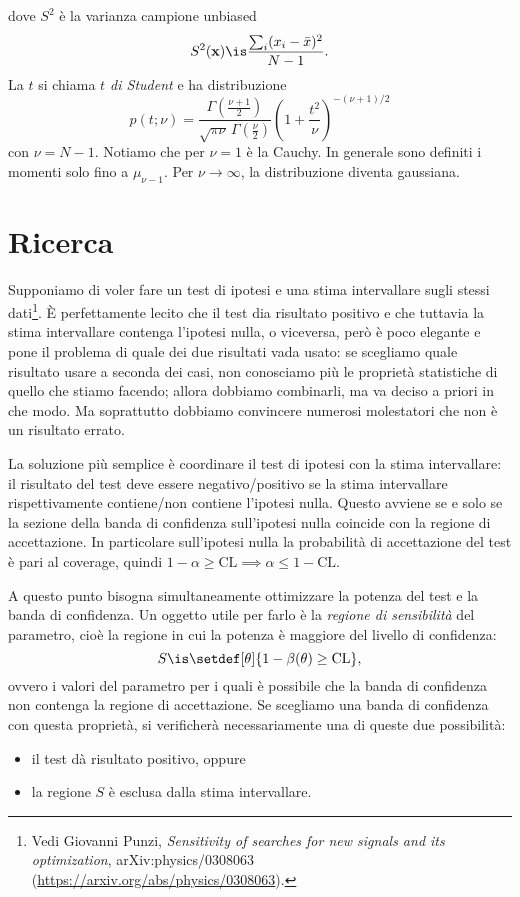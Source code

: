 dove $S^2$ è la varianza campione unbiased
\begin{equation*}
	S^2(\mathbf x)
	\is \frac {\sum_i (x_i-\bar x)^2} {N-1}.
\end{equation*}
La $t$ si chiama \emph{$t$ di Student} e ha distribuzione
\begin{equation*}
	p(t;\nu)
	= \frac {\Gamma\left(\frac{\nu+1}2\right)} {\sqrt{\pi\nu}\, \Gamma\left(\frac\nu2\right)}
	\left(1+\frac{t^2}\nu\right)^{-(\nu+1)/2}
\end{equation*}
con $\nu=N-1$.
Notiamo che per $\nu=1$ è la Cauchy.
In generale sono definiti i momenti solo fino a $\mu_{\nu-1}$.
Per $\nu\to\infty$, la distribuzione diventa gaussiana.

\section{Ricerca}

Supponiamo di voler fare un test di ipotesi e una stima intervallare sugli stessi dati\footnote{Vedi Giovanni Punzi, \emph{Sensitivity of searches for new signals and its optimization}, 	arXiv:physics/0308063 (\url{https://arxiv.org/abs/physics/0308063}).}.
È perfettamente lecito che il test dia risultato positivo
e che tuttavia la stima intervallare contenga l'ipotesi nulla, o viceversa,
però è poco elegante e pone il problema di quale dei due risultati vada usato:
se scegliamo quale risultato usare a seconda dei casi,
non conosciamo più le proprietà statistiche di quello che stiamo facendo;
allora dobbiamo combinarli, ma va deciso a priori in che modo.
Ma soprattutto dobbiamo convincere numerosi molestatori che non è un risultato errato.

La soluzione più semplice è coordinare il test di ipotesi con la stima intervallare:
il risultato del test deve essere negativo/positivo
se la stima intervallare rispettivamente contiene/non contiene l'ipotesi nulla.
Questo avviene se e solo se
la sezione della banda di confidenza sull'ipotesi nulla
coincide con la regione di accettazione.
In particolare sull'ipotesi nulla la probabilità di accettazione del test è pari al coverage,
quindi $1-\alpha\ge\mathrm{CL} \implies \alpha\le1-\mathrm{CL}$.

A questo punto bisogna simultaneamente ottimizzare la potenza del test e la banda di confidenza.
Un oggetto utile per farlo è la \emph{regione di sensibilità} del parametro,
cioè la regione in cui la potenza è maggiore del livello di confidenza:
\begin{equation*}
	S \is \setdef[\theta]{1-\beta(\theta) \ge \mathrm{CL}},
\end{equation*}
ovvero i valori del parametro per i quali è possibile
che la banda di confidenza non contenga la regione di accettazione.
Se scegliamo una banda di confidenza con questa proprietà,
si verificherà necessariamente una di queste due possibilità:
\begin{itemize}
	\item il test dà risultato positivo, oppure
	\item la regione $S$ è esclusa dalla stima intervallare.
\end{itemize}
